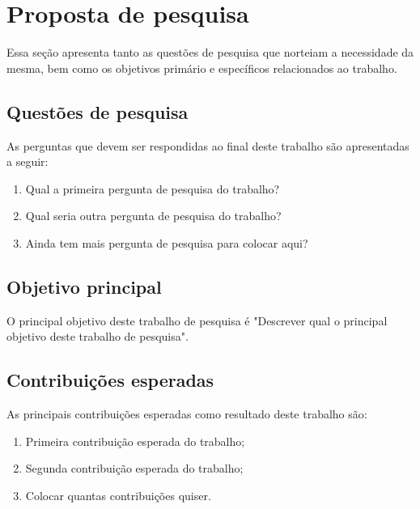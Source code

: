 \chapter{Proposta de pesquisa}\label{cap:proposta_de_pesquisa}

Essa seção apresenta tanto as questões de pesquisa que norteiam a necessidade da mesma, bem como os objetivos primário e específicos relacionados ao trabalho.

\section{Questões de pesquisa} \label{sub:questpesq}

As perguntas que devem %
ser respondidas ao final deste trabalho são apresentadas a seguir:

\begin{enumerate}
    \item Qual a primeira pergunta de pesquisa do trabalho?
    \item Qual seria outra pergunta de pesquisa do trabalho?
    \item Ainda tem mais pergunta de pesquisa para colocar aqui?
\end{enumerate}

\section{Objetivo principal}

O principal objetivo deste trabalho de pesquisa é "Descrever qual o principal objetivo deste trabalho de pesquisa".


\section{Contribuições esperadas}
As principais contribuições esperadas como resultado deste trabalho são:

\begin{enumerate}
    \item Primeira contribuição esperada do trabalho;
    \item Segunda contribuição esperada do trabalho;
    \item Colocar quantas contribuições quiser.
\end{enumerate}
